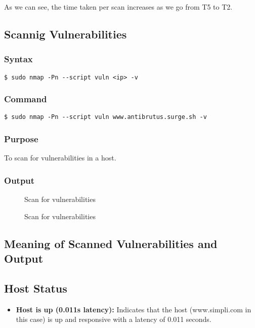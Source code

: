\documentclass[11pt]{article}
\begin{document}
As we can see, the time taken per scan increases as we go from T5 to T2.


\subsection{Scannig Vulnerabilities}
\subsubsection{Syntax}
\begin{verbatim}
$ sudo nmap -Pn --script vuln <ip> -v
\end{verbatim}

\subsubsection*{Command}
\begin{verbatim}
$ sudo nmap -Pn --script vuln www.antibrutus.surge.sh -v
\end{verbatim}

\subsubsection*{Purpose}
To scan for vulnerabilities in a host.

\subsubsection*{Output}
\begin{figure}[H]
    \centering
    \caption{Scan for vulnerabilities}
    \label{fig:1}
\end{figure}
\begin{figure}[H]
    \centering
    \caption{Scan for vulnerabilities}
    \label{fig:1}
\end{figure}


\subsection*{Meaning of Scanned Vulnerabilities and Output}
\subsection*{Host Status}
\begin{itemize}
    \item \textbf{Host is up (0.011s latency):} Indicates that the host (www.simpli.com in this case) is up and responsive with a latency of 0.011 seconds.
\end{itemize}
\end{document}

